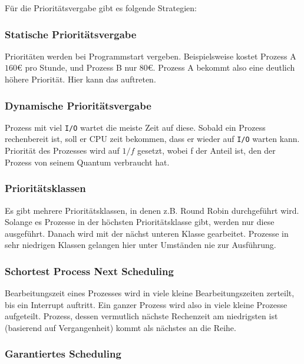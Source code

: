 Für die Prioritätsvergabe gibt es folgende Strategien:

\subsubsection*{Statische Prioritätsvergabe}

Prioritäten werden bei Programmstart vergeben. Beispielsweise kostet Prozess A $160$€ pro Stunde, und Prozess B nur $80$€. Prozess A bekommt also eine deutlich höhere Priorität. Hier kann das  auftreten.

\subsubsection*{Dynamische Prioritätsvergabe}

Prozess mit viel \texttt{I/O} wartet die meiste Zeit auf diese. Sobald ein Prozess rechenbereit ist, soll er CPU zeit bekommen, dass er wieder auf \texttt{I/O} warten kann. Priorität des Prozesses wird auf $1 / f$ gesetzt, wobei f der Anteil ist, den der Prozess von seinem Quantum verbraucht hat.

\subsubsection*{Prioritätsklassen}

Es gibt mehrere Prioritätsklassen, in denen z.B. Round Robin durchgeführt wird. Solange es Prozesse in der höchsten Prioritätsklasse gibt, werden nur diese ausgeführt. Danach wird mit der nächst unteren Klasse gearbeitet. Prozesse in sehr niedrigen Klassen gelangen hier unter Umständen nie zur Ausführung.

\subsubsection{Schortest Process Next Scheduling}

Bearbeitungszeit eines Prozesses wird in viele kleine Bearbeitungszeiten zerteilt, bis ein Interrupt auftritt. Ein ganzer Prozess wird also in viele kleine Prozesse aufgeteilt. Prozess, dessen vermutlich nächste Rechenzeit am niedrigsten ist (basierend auf Vergangenheit) kommt als nächstes an die Reihe.

\subsubsection{Garantiertes Scheduling}

